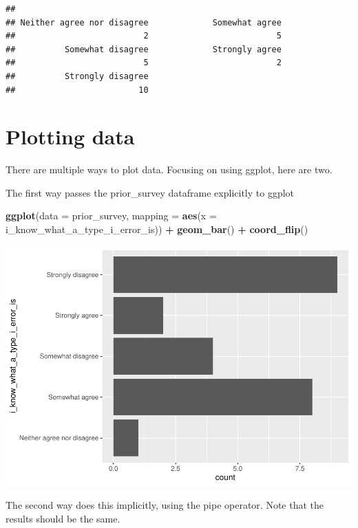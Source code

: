 \documentclass[
]{book}
\newenvironment{Shaded}{\begin{snugshade}}{\end{snugshade}}
\newcommand{\DataTypeTok}[1]{\textcolor[rgb]{0.13,0.29,0.53}{#1}}
\newcommand{\KeywordTok}[1]{\textcolor[rgb]{0.13,0.29,0.53}{\textbf{#1}}}
\newcommand{\NormalTok}[1]{#1}
\newcommand{\OperatorTok}[1]{\textcolor[rgb]{0.81,0.36,0.00}{\textbf{#1}}}
\newcommand{\StringTok}[1]{\textcolor[rgb]{0.31,0.60,0.02}{#1}}
\begin{document}
\begin{verbatim}
## 
## Neither agree nor disagree             Somewhat agree 
##                          2                          5 
##          Somewhat disagree             Strongly agree 
##                          5                          2 
##          Strongly disagree 
##                         10
\end{verbatim}

\hypertarget{plotting-data}{%
\section{Plotting data}\label{plotting-data}}

There are multiple ways to plot data. Focusing on using ggplot, here are two.

The first way passes the prior\_survey dataframe explicitly to ggplot

\begin{Shaded}
\begin{Highlighting}[]
\KeywordTok{ggplot}\NormalTok{(}\DataTypeTok{data =}\NormalTok{ prior\_survey, }\DataTypeTok{mapping =} \KeywordTok{aes}\NormalTok{(}\DataTypeTok{x =}\NormalTok{ i\_know\_what\_a\_type\_i\_error\_is)) }\OperatorTok{+}
\StringTok{  }\KeywordTok{geom\_bar}\NormalTok{() }\OperatorTok{+}
\StringTok{  }\KeywordTok{coord\_flip}\NormalTok{()}
\end{Highlighting}
\end{Shaded}

\includegraphics{test_course_notes_files/figure-latex/unnamed-chunk-7-1.pdf}

The second way does this implicitly, using the pipe operator. Note that the results should be the same.
\end{document}
